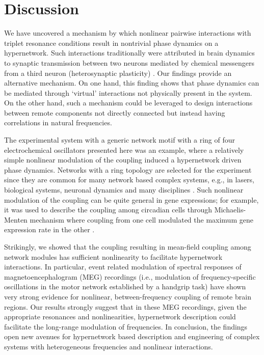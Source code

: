 \documentclass[12pt]{article}
\theoremstyle{plain}
\theoremstyle{definition}
\theoremstyle{remark}
\theoremstyle{remark}
\begin{document}
\section*{Discussion} 
We have uncovered a mechanism by which nonlinear pairwise interactions with triplet resonance conditions result in nontrivial phase dynamics on a hypernetwork. { \color{black} Such interactions traditionally were attributed in brain dynamics  to synaptic transmission between two neurons mediated by chemical messengers from a third neuron (heterosynaptic plasticity) \cite{Chistiakova:2014aa}. Our findings 
provide an alternative mechanism. On one hand, this finding shows that phase dynamics can be mediated through `virtual' interactions not physically present in the system. On the other hand, such  a mechanism could be leveraged to design interactions between remote components not directly connected but instead having correlations in natural frequencies. }

The experimental system with {a generic network motif with a ring of four} electrochemical oscillators presented here was an example, where a relatively simple nonlinear modulation of the  coupling induced a  hypernetwork driven phase dynamics.  {Networks with a ring topology are selected for the experiment since they are common for many network based complex systems, e.g., in lasers, biological systems, neuronal dynamics and many disciplines \cite{popovych2011delay, takamatsu2001spatiotemporal}}.  Such nonlinear modulation of the coupling  can be quite general in  gene expressions; for example, it was used to describe the coupling among circadian cells through  Michaelis-Menten mechanism where  coupling from one cell modulated the maximum gene expression rate in the other \cite{Schroder:2012bb}. 

{\color{black} Strikingly,  we showed that the coupling resulting in mean-field coupling  among network modules has sufficient nonlinearity to facilitate hypernetwork interactions. } {\color{black} In particular, event related modulation of spectral responses of  magnetoencephalogram (MEG) recordings  (i.e., modulation of frequency-specific oscillations in the motor network established by a handgrip task) have shown very strong evidence for nonlinear, between-frequency coupling  of remote brain regions\cite{friston2010}. Our results strongly suggest that in these MEG recordings, given the  appropriate  resonances and nonlinearities, hypernetwork description could facilitate the long-range modulation of frequencies.} In conclusion, the findings  open new avenues for hypernetwork based description and engineering of complex systems with heterogeneous frequencies and nonlinear interactions. 
\end{document}
